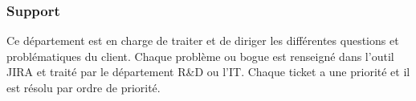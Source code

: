 \subsubsection{Support}
Ce département est en charge de traiter et de diriger les différentes questions et problématiques du client.
Chaque problème ou bogue est renseigné dans l'outil JIRA et traité par le département R\&D ou l'IT.
Chaque ticket a une priorité et il est résolu par ordre de priorité.
